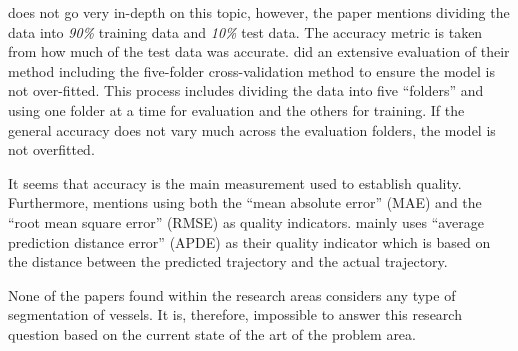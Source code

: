 
\cite{lechtenberg2019} does not go very in-depth on this topic, however, the paper mentions dividing the data into \textit{90\%} training data and \textit{10\%} test data. The accuracy metric is taken from how much of the test data was accurate. \cite{ZHANG2020102729} did an extensive evaluation of their method including the five-folder cross-validation method to ensure the model is not over-fitted. This process includes dividing the data into five “folders” and using one folder at a time for evaluation and the others for training. If the general accuracy does not vary much across the evaluation folders, the model is not overfitted.


It seems that accuracy is the main measurement used to establish quality. Furthermore, \cite{lechtenberg2019} mentions using both the “mean absolute error” (MAE) and the “root mean square error” (RMSE) as quality indicators. \cite{ZHANG2020102729} mainly uses “average prediction distance error” (APDE) as their quality indicator which is based on the distance between the predicted trajectory and the actual trajectory.


None of the papers found within the research areas considers any type of segmentation of vessels. It is, therefore, impossible to answer this research question based on the current state of the art of the problem area.


